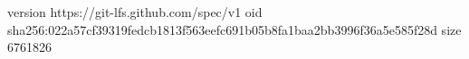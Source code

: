 version https://git-lfs.github.com/spec/v1
oid sha256:022a57cf39319fedcb1813f563eefc691b05b8fa1baa2bb3996f36a5e585f28d
size 6761826
